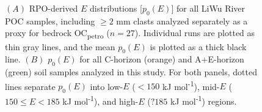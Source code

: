 \begin{figure}[p]
	\label{Ch6Fig:S2} 
\end{figure}

\begin{figure}[p]
	\caption[RPO $p_{0}(E)$ distributions for all samples analyzed]{$(A)$ RPO-derived $E$ distributions [$p_{0}(E)$] for all LiWu River POC samples, including $\geq 2$ mm clasts analyzed separately as a proxy for bedrock OC\textsubscript{petro} ($n = 27$). Individual runs are plotted as thin gray lines, and the mean $p_{0}(E)$ is plotted as a thick black line. $(B)$ $p_{0}(E)$ for all C-horizon (orange) and A+E-horizon (green) soil samples analyzed in this study. For both panels, dotted lines separate $p_{0}(E)$ into low-$E$ ($< 150$ kJ mol\textsuperscript{-1}), mid-$E$ ($150 \leq E < 185$ kJ mol\textsuperscript{-1}), and high-$E$ ($? 185$ kJ mol\textsuperscript{-1}) regions.}
	\label{Ch6Fig:S3} 
\end{figure}

\renewcommand\thefigure{\thechapter.\arabic{figure}}
